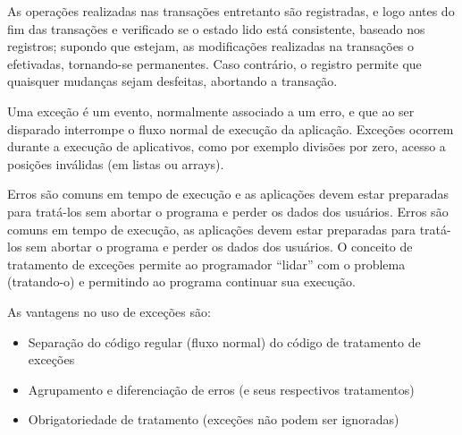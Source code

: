 As operações realizadas nas transações entretanto são registradas, e logo antes do fim das 
transações e verificado se o estado lido está consistente, baseado nos registros; supondo 
que estejam, as modificações realizadas na transações o efetivadas, tornando-se permanentes. 
Caso contrário, o registro permite que quaisquer mudanças sejam desfeitas, abortando a transação.



Uma exceção é um evento, normalmente associado a um erro, e que ao ser disparado interrompe o 
fluxo normal de execução da aplicação. Exceções ocorrem durante a execução de aplicativos, como 
por exemplo divisões por zero, acesso a posições inválidas (em listas ou arrays).


Erros são comuns em tempo de execução e as aplicações devem estar preparadas para tratá-los 
sem abortar o programa e perder os dados dos usuários. Erros são comuns em tempo de execução, 
as aplicações devem estar preparadas para tratá-los sem abortar o programa e perder os dados 
dos usuários. O conceito de tratamento de exceções permite ao programador ``lidar'' com o 
problema (tratando-o) e permitindo ao programa continuar sua execução.

As vantagens no uso de exceções são: 

\begin{itemize}
\item Separação do código regular (fluxo normal) do código de tratamento de exceções
\item Agrupamento e diferenciação de erros (e seus respectivos tratamentos)
\item Obrigatoriedade de tratamento (exceções não podem ser ignoradas)
\end{itemize}


